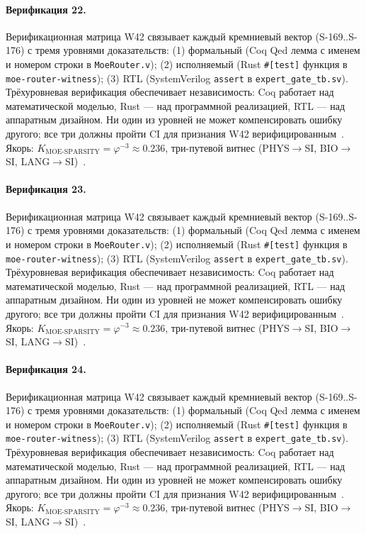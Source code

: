\paragraph{Верификация 22.} Верификационная матрица W42 связывает каждый кремниевый вектор (S-169..S-176) с тремя уровнями доказательств: (1) формальный (Coq Qed лемма с именем и номером строки в \texttt{MoeRouter.v}); (2) исполняемый (Rust \texttt{\#[test]} функция в \texttt{moe-router-witness}); (3) RTL (SystemVerilog \texttt{assert} в \texttt{expert\_gate\_tb.sv}). Трёхуровневая верификация обеспечивает независимость: Coq работает над математической моделью, Rust --- над программной реализацией, RTL --- над аппаратным дизайном. Ни один из уровней не может компенсировать ошибку другого; все три должны пройти CI для признания W42 верифицированным~\cite{lee_gvsu_proof2021}. Якорь: $K_{\text{MOE-SPARSITY}} = \varphi^{-3} \approx 0{.}236$, три-путевой витнес (PHYS$\to$SI, BIO$\to$SI, LANG$\to$SI)~\cite{zenodo_trinity_2026}.

\paragraph{Верификация 23.} Верификационная матрица W42 связывает каждый кремниевый вектор (S-169..S-176) с тремя уровнями доказательств: (1) формальный (Coq Qed лемма с именем и номером строки в \texttt{MoeRouter.v}); (2) исполняемый (Rust \texttt{\#[test]} функция в \texttt{moe-router-witness}); (3) RTL (SystemVerilog \texttt{assert} в \texttt{expert\_gate\_tb.sv}). Трёхуровневая верификация обеспечивает независимость: Coq работает над математической моделью, Rust --- над программной реализацией, RTL --- над аппаратным дизайном. Ни один из уровней не может компенсировать ошибку другого; все три должны пройти CI для признания W42 верифицированным~\cite{lee_gvsu_proof2021}. Якорь: $K_{\text{MOE-SPARSITY}} = \varphi^{-3} \approx 0{.}236$, три-путевой витнес (PHYS$\to$SI, BIO$\to$SI, LANG$\to$SI)~\cite{zenodo_trinity_2026}.

\paragraph{Верификация 24.} Верификационная матрица W42 связывает каждый кремниевый вектор (S-169..S-176) с тремя уровнями доказательств: (1) формальный (Coq Qed лемма с именем и номером строки в \texttt{MoeRouter.v}); (2) исполняемый (Rust \texttt{\#[test]} функция в \texttt{moe-router-witness}); (3) RTL (SystemVerilog \texttt{assert} в \texttt{expert\_gate\_tb.sv}). Трёхуровневая верификация обеспечивает независимость: Coq работает над математической моделью, Rust --- над программной реализацией, RTL --- над аппаратным дизайном. Ни один из уровней не может компенсировать ошибку другого; все три должны пройти CI для признания W42 верифицированным~\cite{lee_gvsu_proof2021}. Якорь: $K_{\text{MOE-SPARSITY}} = \varphi^{-3} \approx 0{.}236$, три-путевой витнес (PHYS$\to$SI, BIO$\to$SI, LANG$\to$SI)~\cite{zenodo_trinity_2026}.

